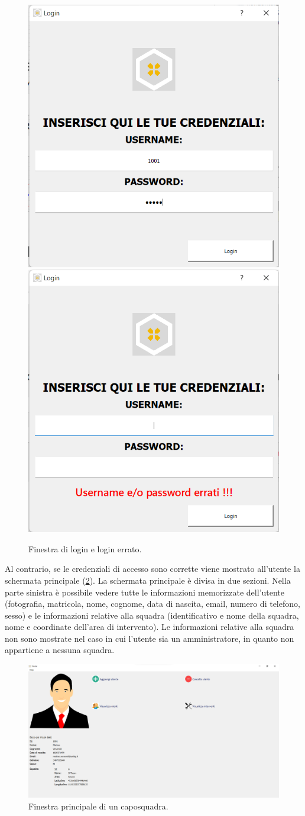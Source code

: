 \begin{figure}[h!]
	\centering
	\includegraphics[width=0.4\linewidth]{./ImageFiles/loginform}
	\includegraphics[width=0.4\linewidth]{./ImageFiles/loginform_errato}
	\caption{Finestra di login e login errato.}
	\label{fig:loginform}
\end{figure}

Al contrario, se le credenziali di accesso sono corrette viene mostrato all'utente la schermata principale (\Fig\ref{fig:home_foreman}). La schermata principale è divisa in due sezioni. Nella parte sinistra è possibile vedere tutte le informazioni memorizzate dell'utente (fotografia, matricola, nome, cognome, data di nascita, email, numero di telefono, sesso) e le informazioni relative alla squadra (identificativo e nome della squadra, nome e coordinate dell'area di intervento). Le informazioni relative alla squadra non sono mostrate nel caso in cui l'utente sia un amministratore, in quanto non appartiene a nessuna squadra.

\begin{figure}[h!]
	\centering
	\includegraphics[width=1\linewidth]{./ImageFiles/home_foreman}
	\caption{Finestra principale di un caposquadra.}
	\label{fig:home_foreman}
\end{figure}

